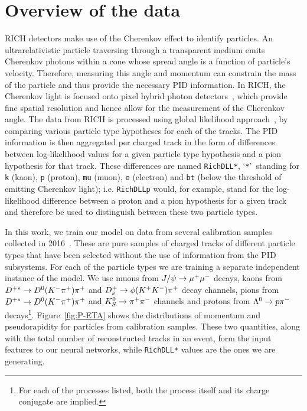 \documentclass[a4paper]{jpconf}
\begin{document}
\section{Overview of the data}

RICH detectors make use of the Cherenkov effect to identify particles. An ultrarelativistic particle traversing through a transparent medium emits Cherenkov photons within a cone whose spread angle is a function of particle's velocity. Therefore, measuring this angle and momentum can constrain the mass of the particle and thus provide the necessary PID information. In RICH, the Cherenkov light is focused onto pixel hybrid photon detectors~\cite{Alves:2008zz}, which provide fine spatial resolution and hence allow for the measurement of the Cherenkov angle. The data from RICH is processed using global likelihood approach~\cite{Forty:1998eqa}, by comparing various particle type hypotheses for each of the tracks. The PID information is then aggregated per charged track in the form of differences between log-likelihood values for a given particle type hypothesis and a pion hypothesis for that track. These differences are named \texttt{RichDLL*}, `\texttt{*}'~standing for \texttt{k} (kaon), \texttt{p} (proton), \texttt{mu} (muon), \texttt{e} (electron) and \texttt{bt} (below the threshold of emitting Cherenkov light); i.e. \texttt{RichDLLp} would, for example, stand for the log-likelihood difference between a proton and a pion hypothesis for a given track and therefore be used to distinguish between these two particle types.



In this work, we train our model on data from several calibration samples collected in 2016~\cite{CalibrationSamples}. These are pure samples of charged tracks of different particle types that have been selected without the use of information from the PID subsystems. For each of the particle types we are training a separate independent instance of the model. We use muons from $J/\psi\rightarrow\mu^+\mu^-$ decays, kaons from $D^{+*}\rightarrow D^0(K^-\pi^+)\pi^+$ and $D^+_s\rightarrow\phi(K^+K^-)\pi^+$ decay channels, pions from $D^{+*}\rightarrow D^0(K^-\pi^+)\pi^+$ and $K^0_S\rightarrow\pi^+\pi^-$ channels and protons from $\Lambda^0\rightarrow p\pi^-$ decays\footnote{For each of the processes listed, both the process itself and its charge conjugate are implied.}. Figure~\ref{fig:P-ETA} shows the distributions of momentum and pseudorapidity for particles from calibration samples. These two quantities, along with the total number of reconstructed tracks in an event, form the input features to our neural networks, while \texttt{RichDLL*} values are the ones we are generating.
\end{document}
